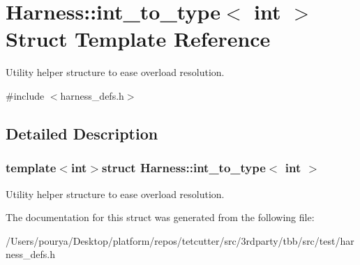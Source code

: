 \hypertarget{structHarness_1_1int__to__type}{}\section{Harness\+:\+:int\+\_\+to\+\_\+type$<$ int $>$ Struct Template Reference}
\label{structHarness_1_1int__to__type}


Utility helper structure to ease overload resolution.  




{\ttfamily \#include $<$harness\+\_\+defs.\+h$>$}



\subsection{Detailed Description}
\subsubsection*{template$<$int$>$struct Harness\+::int\+\_\+to\+\_\+type$<$ int $>$}

Utility helper structure to ease overload resolution. 

The documentation for this struct was generated from the following file\+:\begin{DoxyCompactItemize}
\item 
/\+Users/pourya/\+Desktop/platform/repos/tetcutter/src/3rdparty/tbb/src/test/harness\+\_\+defs.\+h\end{DoxyCompactItemize}
